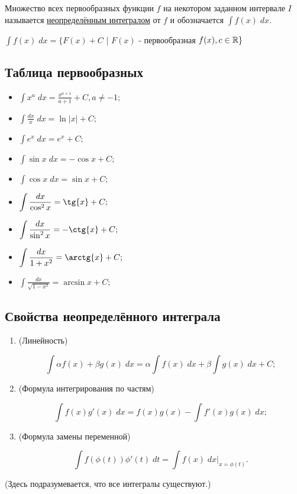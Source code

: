 	\begin{definition}
		Множество всех первообразных функции $f$ на некотором заданном интервале $I$ называется \underline{неопределённым интегралом} от $f$ и обозначается $\displaystyle\int f(x) \; dx$.
	\end{definition}
	
	$\displaystyle\int f(x) \; dx = \{F(x) + C$ | $F(x)$ - первообразная $f(x), c \in \mathbb R\}$
	
	\subsection{Таблица первообразных}
	\begin{itemize}
		\item $\displaystyle\int x^a \; dx = \frac{x^{a + 1}}{a + 1} + C, a \neq -1;$
		\item $\displaystyle\int \frac{dx}{x} \; dx = \ln{|x|} + C;$
		\item $\displaystyle\int e^x \; dx = e^x + C;$
		\item $\displaystyle\int \sin{x} \; dx = -\cos{x} + C;$
		\item $\displaystyle\int \cos{x} \; dx = \sin{x} + C;$
		\item $\displaystyle\int \frac{dx}{\cos^2{x}} = \tg{x} + C;$
		\item $\displaystyle\int \frac{dx}{\sin^2{x}} = -\ctg{x} + C;$
		\item $\displaystyle\int \frac{dx}{1 + x^2} = \arctg{x} + C;$
		\item $\displaystyle\int \frac{dx}{\sqrt{1 - x^2}} = \arcsin{x} + C;$
	\end{itemize}
	
	\subsection{Свойства неопределённого интеграла}
	
	\begin{theorem}
		\begin{enumerate}
			\item (Линейность) 
			
			\[\int \alpha f(x) + \beta g(x) \; dx = \alpha \int f(x) \; dx + \beta \int g(x) \; dx + C;\]
			
			\item (Формула интегрирования по частям) 
			
			\[\int f(x)g'(x) \; dx = f(x)g(x) - \int f'(x)g(x) \; dx;\]
			
			\item (Формула замены переменной)
			
			\[\int f(\phi(t))\phi'(t) \; dt = \int f(x) \; dx\bigg|_{x=\phi(t)}.\]
			
		\end{enumerate}
		
	    (Здесь подразумевается, что все интегралы существуют.)
	\end{theorem}
	
